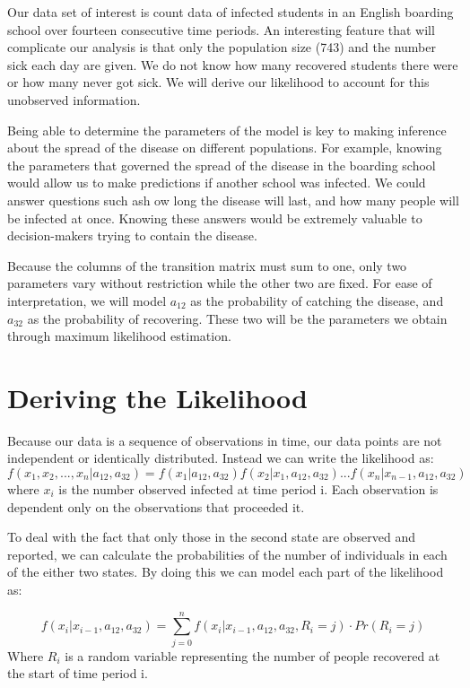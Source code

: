 \documentclass{svproc}
\begin{document}
Our data set of interest is count data of infected students in an English boarding school over fourteen consecutive time periods. An interesting feature that will complicate our analysis is that only the population size (743) and the number sick each day are given. We do not know how many recovered students there were or how many never got sick. We will derive our likelihood to account for this unobserved information. 

Being able to determine the parameters of the model is key to making inference about the spread of the disease on different populations. For example, knowing the parameters that governed the spread of the disease in the boarding school would allow us to make predictions if another school was infected. We could answer questions such ash ow long the disease will last, and how many people will be infected at once. Knowing these answers would be extremely  valuable to decision-makers trying to contain the disease.

Because the columns of the transition matrix must sum to one, only two parameters vary without restriction while the other two are fixed. For ease of interpretation, we will model $a_{12}$ as the probability of catching the disease, and $a_{32}$ as the probability of recovering. These two will be the parameters we obtain through maximum likelihood estimation. 

\section{Deriving the Likelihood}
Because our data is a sequence of observations in time, our data points are not independent or identically distributed. Instead we can write the likelihood as:
\begin{equation}
f(x_1, x_2,...,x_n| a_{12}, a_{32}) = f(x_1| a_{12}, a_{32}) f(x_2|x_1, a_{12}, a_{32}) ... f(x_n|x_{n-1}, a_{12}, a_{32})
\end{equation}
where $x_i$ is the number observed infected at time period i. Each observation is dependent only on the observations that proceeded it.

To deal with the fact that only those in the second state are observed and reported, we can calculate the probabilities of the number of individuals in each of the either two states. By doing this we can model each part of the likelihood as:

\begin{equation}
f(x_i | x_{i-1}, a_{12}, a_{32}) =\sum_{j=0}^n f(x_i | x_{i-1}, a_{12}, a_{32}, R_i=j)\cdot Pr(R_i=j) 
\label{sum}
\end{equation}
Where $R_i$ is a random variable representing the number of people recovered at the start of time period i.
\end{document}
